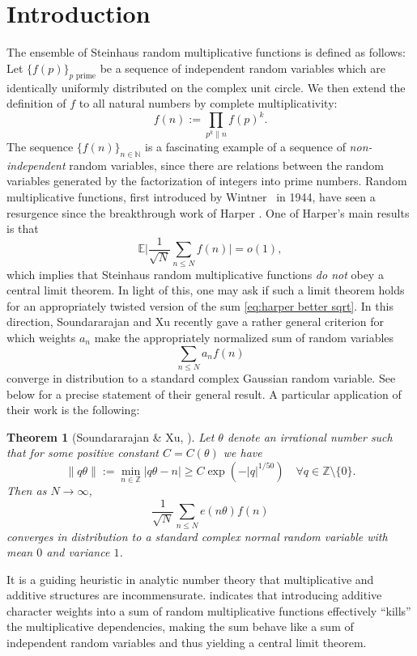\documentclass[12pt]{amsart}
\renewcommand{\leq}{\leqslant}
\renewcommand{\geq}{\geqslant}
\numberwithin{equation}{section}
\theoremstyle{plain}
\newtheorem{thm}{Theorem}[section]
\theoremstyle{definition}
\newcommand{\N}{\mathbb{N}}
\newcommand{\Z}{\mathbb{Z}}
\newcommand{\E}{\mathbb{E}}
\begin{document}
	\section{Introduction}
	The ensemble of Steinhaus random multiplicative functions is defined as follows: Let $\{f(p)\}_{p \text{ prime}}$ be a sequence of independent random variables which are identically uniformly distributed on the complex unit circle. We then extend the definition of $f$ to all natural numbers by complete multiplicativity:
	$$f(n) := \prod_{p^k \parallel n}f(p)^k.$$
	The sequence $\{f(n)\}_{n \in \N}$ is a fascinating example of a sequence of \textit{non-independent} random variables, since there are relations between the random variables generated by the factorization of integers into prime numbers. Random multiplicative functions, first introduced by Wintner~\cite{wintner} in 1944, have seen a resurgence since the breakthrough work of Harper \cite{harper2020moments}. One of Harper's main results is that
	\begin{equation}\label{eq:harper better sqrt}
		\E\bigg|\frac{1}{\sqrt{N}}\sum_{n \leq N} f(n)\bigg|  = o(1),
	\end{equation}
	which implies that Steinhaus random multiplicative functions \textit{do not} obey a central limit theorem. In light of this, one may ask if such a limit theorem holds for an appropriately twisted version of the sum \eqref{eq:harper better sqrt}. In this direction, Soundararajan and Xu \cite{sound-xu-CLT} recently gave a rather general criterion for which weights $a_n$ make the appropriately normalized sum of random variables
	$$\sum_{n \leq N}a_nf(n)$$
	converge in distribution to a standard complex Gaussian random variable. See  below for a precise statement of their general result. A particular application of their work is the following:
	\begin{thm}[{Soundararajan \& Xu, \cite[Corollary 1.6]{sound-xu-CLT}}] \label{thm: sound-xu 1.6}
		Let $\theta$ denote an irrational number such that for some positive constant $C = C(\theta)$ we have
		\begin{equation*}
			\|q\theta\|:= \min_{n \in \Z}|q \theta -n |\geq C\exp(-|q|^{1/50})\quad \forall q \in \Z \setminus \{0\}.
		\end{equation*}
		Then as $N\to \infty$,
		$$\frac{1}{\sqrt{N}}\sum_{n \leq N}e(n \theta)f(n)$$
		converges in distribution to a standard complex normal random variable with mean $0$ and variance $1$.
	\end{thm}
	It is a guiding heuristic in analytic number theory that multiplicative and additive structures are incommensurate.  indicates that introducing additive character weights into a sum of random multiplicative functions effectively ``kills'' the multiplicative dependencies, making the sum behave like a sum of independent random variables and thus yielding a central limit theorem. 
	
\end{document}
